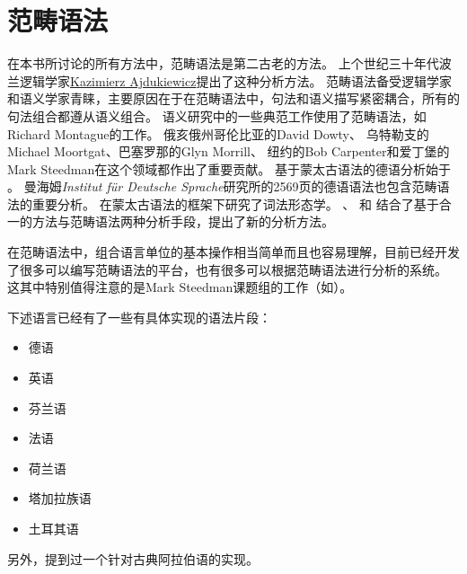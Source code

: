 
\chapter{范畴语法}
\label{Kapitel-CG}\label{chap-CG}

在本书所讨论的所有方法中，范畴语法是第二古老的方法。
上个世纪三十年代波兰逻辑学家\href{http://en.wikipedia.org/wiki/Kazimierz_Ajdukiewicz}{Kazimierz Ajdukiewicz}提出了这种分析方法\citep{Ajdukiewicz35a-u}。
范畴语法备受逻辑学家和语义学家青睐，主要原因在于在范畴语法中，句法和语义描写紧密耦合，所有的句法组合都遵从语义组合。
语义研究中的一些典范工作使用了范畴语法，如Richard Montague\citeyearpar{Montague74a-u}的工作。
俄亥俄州哥伦比亚的David Dowty\citeyearpar{Dowty79a}、 
乌特勒支的Michael Moortgat\citeyearpar{Moortgat89a-u}、巴塞罗那的Glyn Morrill\citeyearpar{Morrill94a-u}、
纽约的Bob Carpenter\citeyearpar{Carpenter98a-u}和爱丁堡的Mark Steedman\citeyearpar{Steedman91a,Steedman97a,Steedman2000a-u}在这个领域都作出了重要贡献。
基于蒙太古语法的德语分析始于 。
曼海姆\emph{Institut für Deutsche Sprache}研究所的2569页的德语语法\citep*{IDS97-not-crossreferenced}也包含范畴语法的重要分析。
 \citet{Fanselow81a-u}在蒙太古语法的框架下研究了词法形态学。
 \citet{Uszkoreit86d}、 \citet{Karttunen86a,Karttunen89a-u}和 \citet*{CKZ88a}结合了基于合一的方法与范畴语法两种分析手段，提出了新的分析方法。

在范畴语法中，组合语言单位的基本操作相当简单而且也容易理解，目前已经开发了很多可以编写范畴语法的平台，也有很多可以根据范畴语法进行分析的系统\citep*{YK90a-u,Carpenter1994a-u,BvN94a-u,Llore1995a-u,KoenigE99a-u,Moot2002a-u,WB2003a-u,BCPW2007a,Morrill2012a}。
这其中特别值得注意的是Mark Steedman课题组的工作（如\citealp*{CHS2002a-u,CC2007a-u}）。

下述语言已经有了一些有具体实现的语法片段：
\begin{itemize}
\item 德语\citep*{Uszkoreit86d,KoenigE99a-u,VHE2003a,VTBS2011a}
\item 英语 \citep{Villavicencio2002a,Baldridge2002a-u,Beavers2002a-u,Beavers2004a-u}
\item 芬兰语 \citep{Karttunen89a-u}
\item 法语 \citep*{BBCG87a-u}
\item 荷兰语 \citep{BvN94a-u,Baldridge2002a-u}
\item 塔加拉族语 \citep{Baldridge2002a-u}
\item 土耳其语 \citep{Hoffmann95a-u,Baldridge2002a-u}
\end{itemize}
另外，\citet*[]{BCPW2007a}提到过一个针对古典阿拉伯语的实现。

